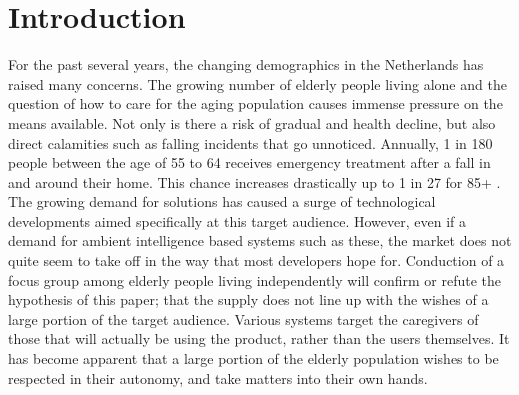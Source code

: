 \documentclass{below-ext}
\begin{document}
\section{Introduction}
For the past several years, the changing demographics in the Netherlands has raised many concerns. The growing number of elderly people living alone and the question of how to care for the aging population causes immense pressure on the means available. Not only is there a risk of gradual and health decline, but also direct calamities such as falling incidents that go unnoticed. Annually, 1 in 180 people between the age of 55 to 64 receives emergency treatment after a fall in and around their home. This chance increases drastically up to 1 in 27 for 85+ \cite{seh}.  The growing demand for solutions has caused a  surge of technological developments aimed specifically at this target audience. However, even if a demand for ambient intelligence based systems such as these, the market does not quite seem to take off in the way that most developers hope for. Conduction of a focus group among elderly people living independently will confirm or refute the hypothesis of this paper; that the supply does not line up with the wishes of a large portion of the target audience. Various systems target the caregivers of those that will actually be using the product, rather than the users themselves. It has become apparent that a large portion of the elderly population wishes to be respected in their autonomy, and take matters into their own hands.\cite{cbs_households}
\end{document}
